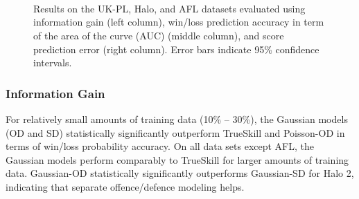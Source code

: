 \begin{center}
\begin{figure*}[t!]
 \centering
 \\
 \\
 \\
\vspace{-0.3cm}
\caption{\small Results on the UK-PL, Halo, and AFL datasets evaluated
using information gain (left column), win/loss prediction accuracy in
term of the area of the curve (AUC) (middle column), and score
prediction error (right column).  Error bars indicate
95\% confidence intervals.}
\vspace{-0.3cm}
\label{fig:Results}
\end{figure*}
\end{center}

\subsubsection{Information Gain}

For relatively small amounts of training data (10\% -- 30\%), the
Gaussian models (OD and SD) statistically significantly outperform
TrueSkill and Poisson-OD in terms of win/loss probability accuracy.
On all data sets except AFL, the Gaussian models perform comparably to
TrueSkill for larger amounts of training data.  Gaussian-OD
statistically significantly outperforms Gaussian-SD for Halo 2,
indicating that separate offence/defence modeling helps.

